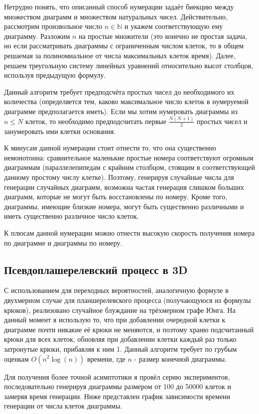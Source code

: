 \documentclass[12pt]{report}
\begin{document}
Нетрудно понять, что описанный способ нумерации задаёт биекцию между множеством диаграмм и множеством натуральных чисел. Действительно, рассмотрим произвольное число $n \in \mathbb{N}$ и укажем соответствующую ему диаграмму. Разложим $n$ на простые множители (это конечно не простая задача, но если рассматривать диаграммы с ограниченным числом клеток, то в общем решаемая за полиномиальное от числа максимальных клеток время). Далее, решаем треугольную систему линейных уравнений относительно высот столбцов, используя предыдущую формулу.

Данный алгоритм требует предподсчёта простых чисел до необходимого их количества (определяется тем, каково максимальное число клеток в нумеруемой диаграмме предполагается иметь). Если мы хотим нумеровать диаграммы из $n \leq N$ клеток, то необходимо предподсчитать первые $\frac{N(N+1)}{2}$ простых чисел и занумеровать ими клетки основания.

К минусам данной нумерации стоит отнести то, что она существенно немонотонна: сравнительное маленькие простые номера соответствуют огромным диаграммам (параллелепипедам с крайним столбцом, стоящим в соответствующей данному простому числу клетке). Поэтому, генерируя случайные числа для генерации случайных диаграмм, возможна частая генерация слишком больших диаграмм, которые не могут быть восстановлены по номеру. Кроме того, диаграммы, имеющие близкие номера, могут быть существенно различными и иметь существенно различное число клеток.

К плюсам данной нумерации можно отнести высокую скорость получения номера по диаграмме и диаграммы по номеру.

\newpage
\subsection*{Псевдоплашерелевский процесс в 3D}
\hspace{\parindent}С использованием для переходных вероятностей, аналогичную формуле в двухмерном случае для планшерелевского процесса (получающуюся из формулы крюков), реализовано случайное блуждание на трёхмерном графе Юнга.
На данный момент я использую то, что при добавлении очередной клетки к диаграмме почти никакие её крюки не меняются, и поэтому храню подсчитанный крюки для всех клеток, обновляя при добавлении клетки каждый раз только затронутые крюки, прибавляя к ним 1. Данный алгоритм требует по грубым оценкам $O(n^2\log(n))$ времени, где $n$ - размер конечной диаграммы.

Для получения более точной асимптотики я провёл серию экспериментов, последовательно генерируя диаграммы размером от 100 до 50000 клеток и замеряя время генерации. Ниже представлен график зависимости времени генерации от числа клеток диаграммы.
\end{document}
